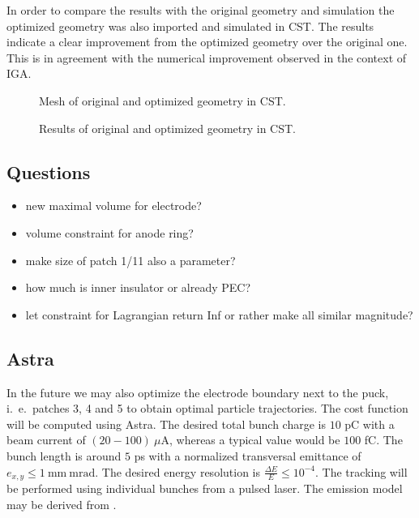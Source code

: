 In order to compare the results with the original geometry and simulation the optimized geometry was also imported and simulated in CST. The results indicate a clear improvement from the optimized geometry over the original one. This is in agreement with the numerical improvement observed in the context of IGA.

\begin{center}
\begin{figure}[H]
   \begin{subfigure}{0.45\textwidth}
   \end{subfigure}
   \begin{subfigure}{0.45\textwidth}
   \end{subfigure}
   \caption{Mesh of original and optimized geometry in CST.}
\end{figure}
\end{center}

\begin{center}
\begin{figure}[H]
   \begin{subfigure}{0.45\textwidth}
   \end{subfigure}
   \begin{subfigure}{0.45\textwidth}
   \end{subfigure}
   \caption{Results of original and optimized geometry in CST.}
\end{figure}
\end{center}

\subsection{Questions}
\begin{itemize}
   \item new maximal volume for electrode?
   \item volume constraint for anode ring?
   \item make size of patch 1/11 also a parameter?
   \item how much is inner insulator or already PEC?

   \item let constraint for Lagrangian return Inf or rather make all similar magnitude?
\end{itemize}

\subsection{Astra}
In the future we may also optimize the electrode boundary next to the puck, i.~e.~patches 3, 4 and 5 to obtain optimal particle trajectories. The cost function will be computed using Astra.
The desired total bunch charge is $10$ pC with a beam current of $(20-100)\ \mu\mathrm{A}$, whereas a typical value would be $100$ fC. The bunch length is around $5$ ps with a normalized transversal emittance of $e_{x,y} \leq 1\ \mathrm{mm\: mrad}$. The desired energy resolution is $\frac{\Delta E}{E} \leq 10^{-4}$.
The tracking will be performed using individual bunches from a pulsed laser. The emission model may be derived from \cite{wagner}.
